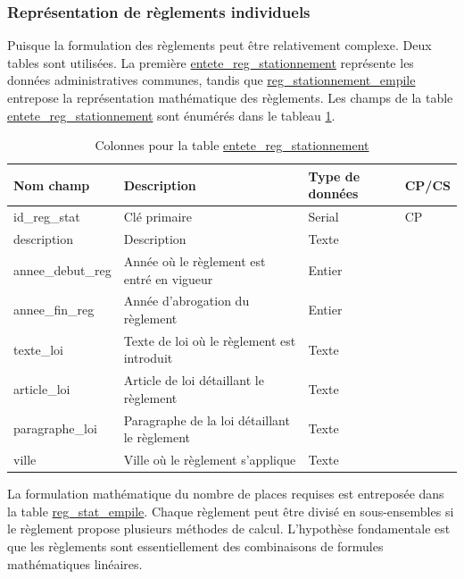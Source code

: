     \subsubsection{Représentation de règlements individuels} 
    Puisque la formulation des règlements peut être relativement complexe. Deux tables sont utilisées. La première \underline{entete\_reg\_stationnement} représente les données administratives communes, tandis que \underline{reg\_stationnement\_empile} entrepose la représentation mathématique des règlements. Les champs de la table \underline{entete\_reg\_stationnement} sont énumérés dans le tableau \ref{tab:definition_entete_reg_stationnement}.  \par
    \begin{table}[h]
        \centering
        \begin{tabular}{m{}|m{}m{}m{}}
            \hline
            Nom champ & Description & Type de données & CP/CS  \\
            \hline
            id\_reg\_stat & Clé primaire  & Serial & CP \\ 
            description & Description & Texte & \\ 
            annee\_debut\_reg & Année où le règlement est entré en vigueur & Entier & \\ 
            annee\_fin\_reg & Année d'abrogation du règlement & Entier & \\ 
            texte\_loi & Texte de loi où le règlement est introduit & Texte & \\
            article\_loi & Article de loi détaillant le règlement & Texte & \\
            paragraphe\_loi &  Paragraphe de la loi détaillant le règlement & Texte & \\ 
            ville & Ville où le règlement s'applique & Texte & \\
            
            \hline
        \end{tabular}
        \caption{Colonnes pour la table \underline{entete\_reg\_stationnement}}
        \label{tab:definition_entete_reg_stationnement}
    \end{table}
    La formulation mathématique du nombre de places requises est entreposée dans la table \underline{reg\_stat\_empile}. Chaque règlement peut être divisé en sous-ensembles si le règlement propose plusieurs méthodes de calcul. L'hypothèse fondamentale est que les règlements sont essentiellement des combinaisons de formules mathématiques linéaires.\par
